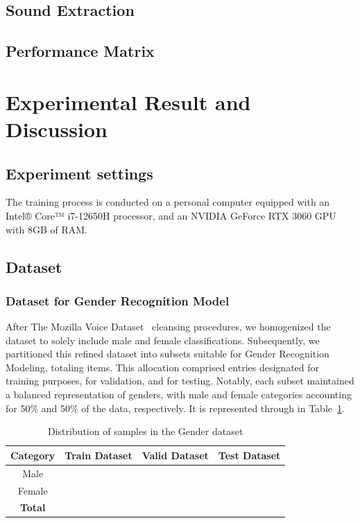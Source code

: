 \documentclass[conference, 10pt]{IEEEtran}
\begin{document}
\subsection{Sound Extraction}
\subsection{Performance Matrix}

\section{Experimental Result and Discussion}
\subsection{Experiment settings}

The training process is conducted on a personal computer equipped with an Intel® Core™ i7-12650H processor, and an NVIDIA GeForce RTX 3060 GPU with 8GB of RAM.
\subsection{Dataset}
\subsubsection{Dataset for Gender Recognition Model}

After The Mozilla Voice Dataset~\cite{mozilla_voice} cleansing procedures, we homogenized the dataset to solely include male and female classifications. Subsequently, we partitioned this refined dataset into subsets suitable for Gender Recognition Modeling, totaling %
items. This allocation comprised %
entries designated for training purposes, %
for validation, and %
for testing. Notably, each subset maintained a balanced representation of genders, with male and female categories accounting for 50\% and 50\% of the data, respectively. It is represented through in Table~\ref{tab:Distribution of samples in the Gender dataset}.

\begin{table}[htbp]
    \centering
    \caption{Distribution of samples in the Gender dataset}
    \label{tab:Distribution of samples in the Gender dataset}
    \begin{tabular}{|c|ccc|}
    \hline
    \textbf{Category} & \textbf{Train Dataset} & \textbf{Valid Dataset} & \textbf{Test Dataset}\\
    \hline
    Male &  &  &  \\
    Female &  &  &  \\
    \hline
    \textbf{Total} &  &  & \\
    \hline
    \end{tabular}
\end{table}
\end{document}
